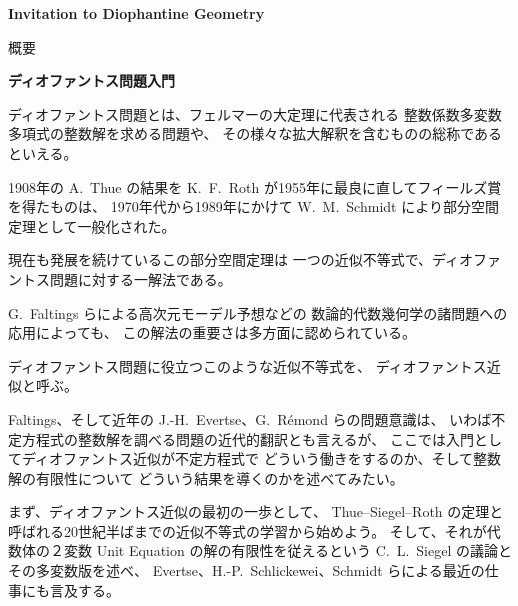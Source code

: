 \documentclass[uplatex,dvipdfmx]{jlreq}
\begin{document}
\begin{center}
  \vspace*{20pt}
  {\Huge\bfseries Invitation to Diophantine Geometry}

  \vspace{1pc}
  {\Large 概要}
\end{center}

\vfill

\newpage

\begin{center}
  {\Large\bfseries ディオファントス問題入門}
\end{center}

\bigskip
\hspace*{\fill}{\large\bfseries 平田　典子（Noriko Hirata-Kohno：日大・理工）}

\bigskip

ディオファントス問題とは、フェルマーの大定理に代表される
整数係数多変数多項式の整数解を求める問題や、
その様々な拡大解釈を含むものの総称であるといえる。

\medskip

1908年の A.~Thue の結果を K.~F.~Roth が1955年に最良に直してフィールズ賞を得たものは、
1970年代から1989年にかけて W.~M.~Schmidt により部分空間定理として一般化された。

現在も発展を続けているこの部分空間定理は
一つの近似不等式で、ディオファントス問題に対する一解法である。

G.~Faltings らによる高次元モーデル予想などの
数論的代数幾何学の諸問題への応用によっても、
この解法の重要さは多方面に認められている。

ディオファントス問題に役立つこのような近似不等式を、
ディオファントス近似と呼ぶ。

\medskip

Faltings、そして近年の J.-H.~Evertse、G.~Rémond らの問題意識は、
いわば不定方程式の整数解を調べる問題の近代的翻訳とも言えるが、
ここでは入門としてディオファントス近似が不定方程式で
どういう働きをするのか、そして整数解の有限性について
どういう結果を導くのかを述べてみたい。

\medskip

まず、ディオファントス近似の最初の一歩として、
Thue--Siegel--Roth の定理と呼ばれる20世紀半ばまでの近似不等式の学習から始めよう。
そして、それが代数体の２変数 Unit Equation の解の有限性を従えるという
C.~L.~Siegel の議論とその多変数版を述べ、
Evertse、H.-P.~Schlickewei、Schmidt らによる最近の仕事にも言及する。
\end{document}

